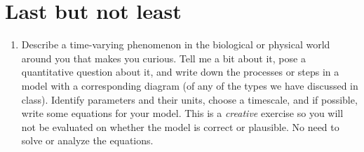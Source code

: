 \documentclass[11pt,onecolumn,superscriptaddress,notitlepage]{article}
\begin{document}
\section*{Last but not least}
\begin{enumerate}[resume]
	\item Describe a time-varying phenomenon in the biological or physical world around you that makes you curious. Tell me a bit about it, pose a quantitative question about it, and write down the processes or steps in a model with a corresponding diagram (of any of the types we have discussed in class). Identify parameters and their units, choose a timescale, and if possible, write some equations for your model. This is a {\it creative} exercise so you will not be evaluated on whether the model is correct or plausible. No need to solve or analyze the equations. 
\end{enumerate}


\end{document}

